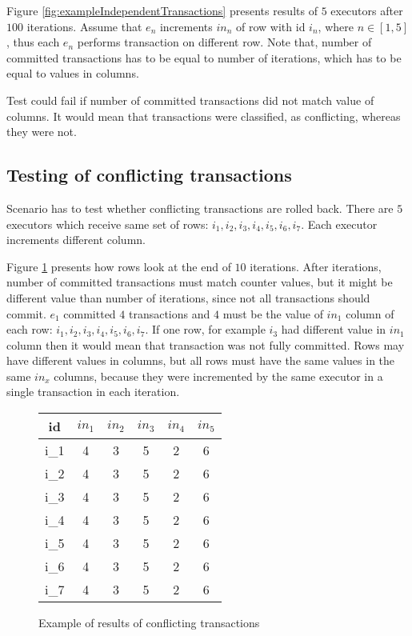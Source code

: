 Figure \ref{fig:exampleIndependentTransactions} presents results of $5$ executors after $100$ iterations. 
Assume that $e_n$ increments $in_n$ of row with id $i_n$, where $n\in [1,5]$, thus each $e_n$ performs transaction on different row.
Note that, number of committed transactions has to be equal to number of iterations, which has to be equal to values in columns.

Test could fail if number of committed transactions did not match value of columns. It would mean that transactions were classified, as conflicting, whereas they were not.

\subsection{Testing of conflicting transactions}
Scenario has to test whether conflicting transactions are rolled back. 
There are $5$ executors which receive same set of rows: $i_1, i_2, i_3, i_4, i_5, i_6, i_7$. Each executor increments different column. 

Figure \ref{fig:exampleConflictingTransactions} presents how rows look at the end of $10$ iterations.
After iterations, number of committed transactions must match counter values, but it might be different value than number of iterations, since not all transactions should commit. $e_1$ committed $4$ transactions and $4$ must be the value of $in_1$ column of each row: $i_1, i_2, i_3, i_4, i_5, i_6, i_7$. If one row, for example $i_3$ had different value in $in_1$ column then it would mean that transaction was not fully committed.
Rows may have different values in columns, but all rows must have the same values in the same $in_{x}$ columns, because they were incremented by the same executor in a single transaction in each iteration.


\begin{figure}[h]
\centering
\begin{tabular}{c||c|c|c|c|c}
        \toprule
        id & $in_{1}$ & $in_{2}$ & $in_{3}$ & $in_{4}$ & $in_{5}$ \\ \midrule
        i_1 &   4        & 3        & 5        &  2       & 6        \\
        i_2 &   4        & 3        & 5        &  2       & 6         \\ 
        i_3 &   4        & 3        & 5        &  2       & 6         \\ 
        i_4 &   4        & 3        & 5        &  2       & 6         \\ 
        i_5 &   4        & 3        & 5        &  2       & 6         \\ 
        i_6 &   4        & 3        & 5        &  2       & 6         \\ 
        i_7 &   4        & 3        & 5        &  2       & 6         \\  \bottomrule
      \end{tabular}
      \caption{Example of results of conflicting transactions}
  \label{fig:exampleConflictingTransactions}
\end{figure}

